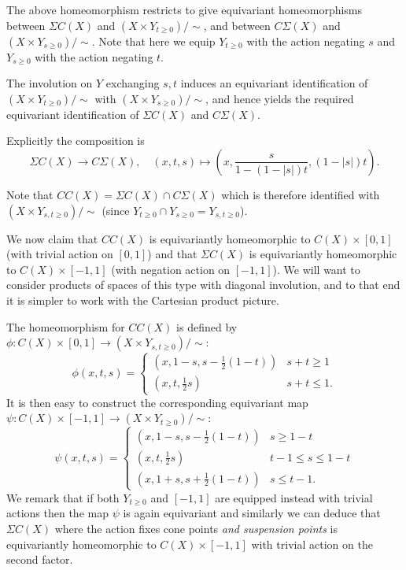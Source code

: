 \documentclass[11pt,a4paper]{article}
\def\suspcone{Y_{t\geq0}}
\def\conesusp{Y_{s\geq0}}
\def\conecone{Y_{s,t\geq0}}
\def\suspsusp{Y}
\begin{document}
The above homeomorphism restricts to give equivariant homeomorphisms between $\Sigma C(X)$ and $(X\times \suspcone)/\sim$, and between $C\Sigma (X)$ and $(X\times \conesusp)/\sim$.  Note that here we equip $\suspcone$ with the action negating $s$ and $\conesusp$ with the action negating $t$.

The involution on $\suspsusp$ exchanging $s,t$ induces an equivariant identification of $(X\times \suspcone)/\sim$ with $(X\times \conesusp)/\sim$, and hence yields the required equivariant identification of $\Sigma C(X)$ and $C\Sigma (X)$.

Explicitly the composition is
\[
\Sigma C(X)\to C\Sigma (X), \quad (x,t,s)\mapsto (x,\frac{s}{1-(1-|s|)t},(1-|s|)t).
\]




Note that $CC(X)=\Sigma C(X) \cap C\Sigma (X)$ which is therefore identified with $(X\times \conecone)/\sim$ (since $\suspcone\cap \conesusp=\conecone$).

We now claim that $CC(X)$ is equivariantly homeomorphic to $C(X)\times [0,1]$ (with trivial action on $[0,1]$) and that $\Sigma C(X)$ is equivariantly homeomorphic to $C(X)\times [-1,1]$ (with negation action on $[-1,1]$).  We will want to consider products of spaces of this type with diagonal involution, and to that end it is simpler to work with the Cartesian product picture.


The homeomorphism for $CC(X)$ is defined by $\phi:C(X) \times [0,1] \to (X\times \conecone)/\sim$:
\[
\phi(x,t,s) = \begin{cases}
    (x,1-s,s-\frac 12 (1-t)) & s+t\geq 1\\
    (x,t,\frac 12 s) & s+t \leq 1.
\end{cases}
\]
It is then easy to construct the corresponding equivariant map $\psi:C(X) \times [-1,1] \to (X\times \suspcone)/\sim$:
\[
\psi(x,t,s) = \begin{cases}
    (x,1-s,s-\frac 12 (1-t)) & s\geq 1-t\\
    (x,t,\frac 12 s) & t-1\leq s\leq 1-t\\
    (x,1+s,s+\frac 12 (1-t)) & s\leq t-1.
\end{cases}
\]
We remark that if both $\suspcone$ and $[-1,1]$ are equipped instead with trivial actions then the map $\psi$ is again equivariant and similarly we can deduce that
$\Sigma C(X)$ where the action fixes cone points \emph{and suspension points} is equivariantly homeomorphic to $C(X)\times [-1,1]$ with trivial action on the second factor.
\end{document}
